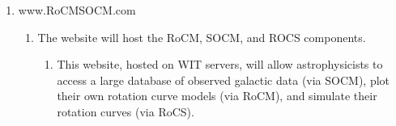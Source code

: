 \documentclass[titlepage]{article}
\begin{document}
\begin{enumerate}
\begin{enumerate}
  \end{enumerate} 
  	\item www.RoCMSOCM.com
    	\begin{enumerate}
        	\item The website will host the RoCM, SOCM, and ROCS components.
        	\begin{enumerate}
              \item This website, hosted on WIT servers, will allow astrophysicists to access a large database of observed galactic data (via SOCM), plot their own rotation curve models (via RoCM), and simulate their rotation curves (via RoCS).
        	\end{enumerate}
        \end{enumerate}
    
   
\end{enumerate}
\end{document}
